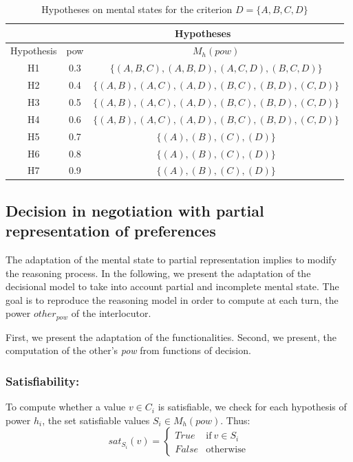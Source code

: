 \documentclass[conference, letterpaper]{IEEEtran}
\begin{document}
\begin{table}[h]
	\centering
	\begin{tabular}{ |c|c|c| }
		\hline
		& \multicolumn{2}{c|}{Hypotheses}  \\
		\hline
		Hypothesis & pow & $M_h(pow)$ \\
		\hline
		H1&0.3&$\{ (A,B,C) , (A,B,D), (A,C,D), (B,C,D) \}$ \\
		\hline
		H2&0.4&$\{ (A,B), (A,C), (A,D), (B,C), (B,D), (C,D) \}$ \\
		\hline
		H3&0.5&$\{ (A,B), (A,C), (A,D), (B,C), (B,D), (C,D) \}$\\
		\hline
		H4&0.6&$\{ (A,B), (A,C), (A,D), (B,C), (B,D), (C,D) \}$ \\
		\hline
		H5&0.7&$\{ (A), (B), (C), (D) \}$\\
		\hline
		H6&0.8&$\{ (A), (B), (C), (D) \}$ \\
		\hline
		H7&0.9&$\{ (A), (B), (C), (D) \}$ \\
		\hline
	\end{tabular}
	\caption{Hypotheses on mental states for the criterion $D=\{A, B, C, D\}$}
	\label{table:poss}
\end{table}

\subsection{Decision in negotiation with partial representation of preferences}
The adaptation of the mental state to partial representation implies to modify the reasoning process. In the following, we present the adaptation of the decisional model to take into account partial and incomplete mental state. The goal is to reproduce the reasoning model in order to compute at each turn, the power $other_{pow}$ of the interlocutor. 

First, we present the adaptation of the functionalities. Second, we present, the computation of the other's \emph{pow} from functions of decision.   

\subsubsection{Satisfiability:}
To compute whether a value $v \in C_i$ is satisfiable, we check for each hypothesis of power $h_i$, the set satisfiable values $S_i \in M_h(pow)$.
Thus: 
\begin{equation}
sat_{S_i}(v)= \left\{\begin{array}{ll}
True	 & \mathrm{if\ }  v \in S_i\\
False & \mathrm{otherwise}
\end{array}\right.
\end{equation}
\end{document}
